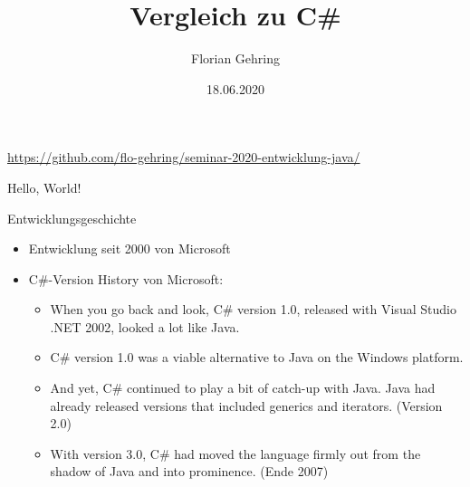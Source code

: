 \documentclass[11pt]{beamer}
\author{Florian Gehring}
\title{Vergleich zu C\#}
\date{18.06.2020}
\begin{document}

\begin{frame}
	\titlepage
	\begin{center}
		\tiny{\url{https://github.com/flo-gehring/seminar-2020-entwicklung-java/} }
	\end{center}
\end{frame}


\begin{frame}{Hello, World!}
\end{frame}


\begin{frame}{Entwicklungsgeschichte}
	\begin{itemize}
		\item Entwicklung seit 2000 von Microsoft
		\item C\#-Version History von Microsoft:\cite{csharp_history}
		\begin{itemize}
					\item \glqq When you go back and look, C\# version 1.0, released with Visual Studio .NET 2002, looked a lot like Java.\grqq{}
		 \item \glqq C\# version 1.0 was a viable alternative to Java on the Windows platform.\grqq{}
		 \item \glqq And yet, C\# continued to play a bit of catch-up with Java. Java had already released versions that included generics and iterators.\grqq{} (Version 2.0)
		 \item \glqq With version 3.0, C\# had moved the language firmly out from the shadow of Java and into prominence.\grqq{} (Ende 2007)
		\end{itemize}
	\end{itemize}
\end{frame}
\end{document}
